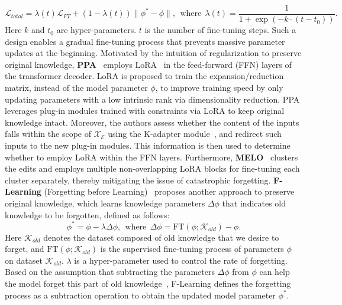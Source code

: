 \documentclass[acmsmall, screen]{acmart}
\begin{document}
\begin{equation}
    \mathcal{L}_{total}=\lambda(t)\mathcal{L}_{FT}+(1-\lambda(t))\|\phi^*-\phi\|,\ \ \text{where}\ \ \lambda(t)=\frac{1}{1+\exp(-k\cdot(t-t_0))}.
\end{equation}
Here $k$ and $t_0$ are hyper-parameters. $t$ is the number of fine-tuning steps. Such a design enables a gradual fine-tuning process that prevents massive parameter updates at the beginning. Motivated by the intuition of regularization to preserve original knowledge, \textbf{PPA}~\cite{lee2022plugandplay} employs LoRA~\cite{hu2021lora} in the feed-forward (FFN) layers of the transformer decoder. LoRA is proposed to train the expansion/reduction matrix, instead of the model parameter $\phi$, to improve training speed by only updating parameters with a low intrinsic rank via dimensionality reduction. PPA leverages plug-in modules trained with constraints via LoRA to keep original knowledge intact. 
Moreover, the authors assess whether the content of the inputs falls within the scope of $\mathcal{X}_\mathcal{E}$ using the K-adapter module~\cite{wang2020k}, and redirect such inputs to the new plug-in modules. This information is then used to determine whether to employ LoRA within the FFN layers.
{Furthermore, \textbf{MELO}~\cite{yu2024melo} clusters the edits and employs multiple non-overlapping LoRA blocks for fine-tuning each cluster separately, thereby mitigating the issue of catastrophic forgetting.}
\textbf{F-Learning} (Forgetting before Learning)~\cite{ni2023forgetting} proposes another approach to preserve original knowledge, which learns knowledge parameters $\Delta\phi$ that indicates old knowledge to be forgotten, defined as follows:
\begin{equation}
   \phi^*=\phi-\lambda\Delta\phi,\ \ \text{where}\ \   \Delta\phi=\text{FT}(\phi; \mathcal{K}_{old})-\phi.
\end{equation}
Here $\mathcal{K}_{old}$ denotes the dataset composed of old knowledge that we desire to forget, and $\text{FT}(\phi;\mathcal{K}_{old})$ is the supervised fine-tuning process of parameters $\phi$ on dataset $\mathcal{K}_{old}$. $\lambda$ is a hyper-parameter used to control the rate of forgetting. Based on the assumption that subtracting the parameters $\Delta\phi$ from $\phi$ can help the model forget this part of old knowledge~\cite{ilharco2023editing}, F-Learning defines the forgetting process as a subtraction operation to obtain the updated model parameter $\phi^*$.
\end{document}
